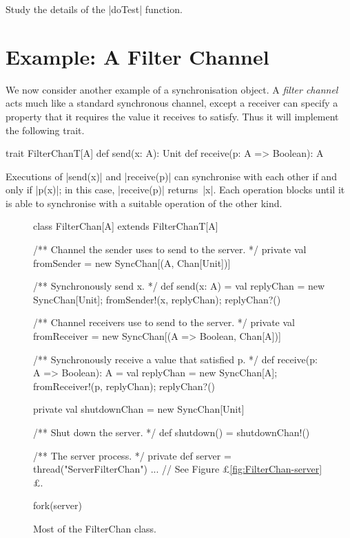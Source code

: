 \begin{instruction}
Study the details of the |doTest| function.
\end{instruction}


\section{Example: A Filter Channel}

We now consider another example of a synchronisation object.  A \emph{filter
  channel} acts much like a standard synchronous channel, except a receiver
can specify a property that it requires the value it receives to satisfy.
Thus it will implement the following trait.
%
\begin{scala}
trait FilterChanT[A]{
  def send(x: A): Unit
  def receive(p: A => Boolean): A 
}
\end{scala}
%
Executions of |send(x)| and |receive(p)| can synchronise with each other
if and only if |p(x)|; in this case, |receive(p)| returns~|x|.  Each operation
blocks until it is able to synchronise with a suitable operation of the other
kind. 


\begin{figure}
\begin{scala}
class FilterChan[A] extends FilterChanT[A]{
  /** Channel the sender uses to send to the server. */
  private val fromSender = new SyncChan[(A, Chan[Unit])]

  /** Synchronously send x. */
  def send(x: A) = { 
    val replyChan = new SyncChan[Unit]; fromSender!(x, replyChan); replyChan?()
  }

  /** Channel receivers use to send to the server. */
  private val fromReceiver = new SyncChan[(A => Boolean, Chan[A])]
  
  /** Synchronously receive a value that satisfied p. */
  def receive(p: A => Boolean): A = {
    val replyChan = new SyncChan[A]; fromReceiver!(p, replyChan); replyChan?()
  }

  private val shutdownChan = new SyncChan[Unit]

  /** Shut down the server. */
  def shutdown() = shutdownChan!() 

  /** The server process. */
  private def server = thread("ServerFilterChan"){ ... } // See Figure £\ref{fig:FilterChan-server}£.

  fork(server)
}
\end{scala}
\caption{Most of the {\scalashape FilterChan} class.}
\label{fig:FilterChan}
\end{figure}

